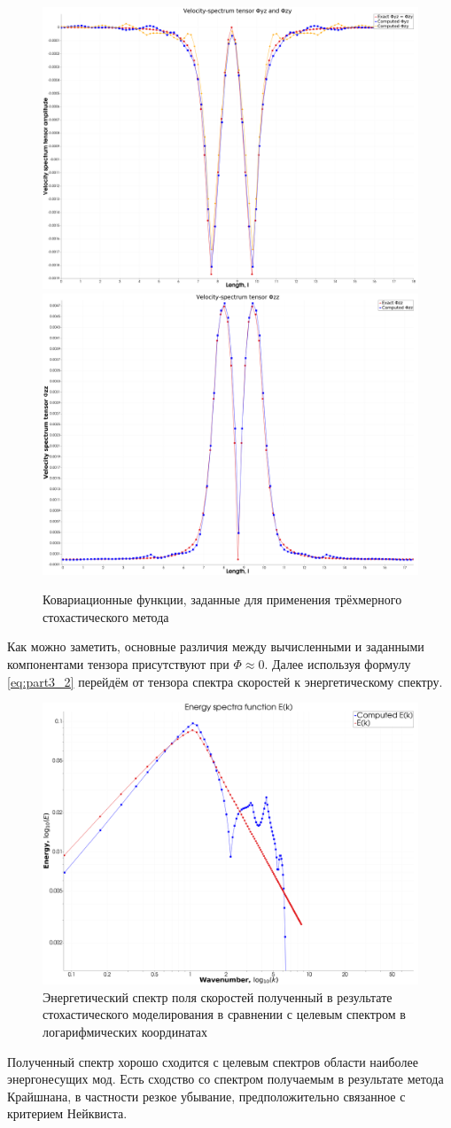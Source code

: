 \begin{figure}[!h]
{        \hfill
        {\includegraphics[width=0.34\linewidth]{images/kriging/3components/phi_23_32_diagonal.png}}
        \hfill
        {\includegraphics[width=0.34\linewidth]{images/kriging/3components/phi_33_diagonal.png}}
        \hfill
    }
    
    \caption{Ковариационные функции, заданные для применения трёхмерного стохастического метода}
    \label{img:exact_covariance_comparison_heat_maps}  
\end{figure}

Как можно заметить, основные различия между вычисленными и заданными компонентами тензора присутствуют при $\Phi \approx 0$. Далее используя формулу \eqref{eq:part3_2} перейдём от тензора спектра скоростей к энергетическому спектру. 

\begin{figure}[ht] 
  \center
  \includegraphics [width=0.9\linewidth] {images/kriging/3components/energy_function_kriging_loglog.png}
  \caption{Энергетический спектр поля скоростей полученный в результате стохастического моделирования в сравнении с целевым спектром в логарифмических координатах} 
  \label{img:kriging_spectra_function_compare}  
\end{figure}

Полученный спектр хорошо сходится с целевым спектров области наиболее энергонесущих мод. Есть сходство со спектром получаемым в результате метода Крайшнана, в частности резкое убывание, предположительно связанное с критерием Нейквиста.